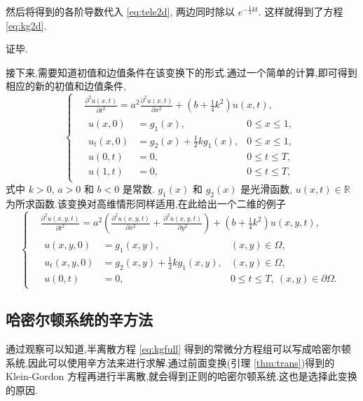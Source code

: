 然后将得到的各阶导数代入 \eqref{eq:tele2d}, 两边同时除以 $e^{-\frac{1}{2}kt}$. 这样就得到了方程 \eqref{eq:kg2d}.

证毕.

接下来,需要知道初值和边值条件在该变换下的形式.通过一个简单的计算,即可得到相应的新的初值和边值条件,
\begin{equation}\label{eq:kgfull}
\left\lbrace
\begin{aligned}
&\frac{\partial ^2 u(x,t)}{\partial t^2}=a^2 \frac{\partial ^2 u(x,t)}{\partial x^2} + (b+\frac{1}{4}k^2) u(x,t),\\
&\begin{aligned}
u(x,0)&=g_1(x),&0 \le x \le 1,\\
u_t(x,0)&=g_2(x)+\frac{1}{2}k g_1(x),&0 \le x \le 1,\\
u(0,t)&=0,&0 \le t \le T,\\
u(1,t)&=0,&0 \le t \le T,
\end{aligned}
\end{aligned}
\right.
\end{equation}
式中 $k > 0$, $a>0$ 和 $b < 0$ 是常数. $g_1(x)$ 和 $g_2(x)$ 是光滑函数, $u(x,t) \in \mathbb{R}$ 为所求函数.该变换对高维情形同样适用,在此给出一个二维的例子
\begin{equation*}
\left\lbrace
\begin{aligned}
&\frac{\partial ^2 u(x,y,t)}{\partial t^2}=a^2 (\frac{\partial ^2 u(x,y,t)}{\partial x^2}+ \frac{\partial ^2 u(x,y,t)}{\partial y^2})
+ (b+\frac{1}{4}k^2) u(x,y,t),\\
&\begin{aligned}
u(x,y,0)&=g_1(x,y),&(x,y)\in \Omega,\\
u_t(x,y,0)&=g_2(x,y)+\frac{1}{2}k g_1(x,y),&(x,y)\in \Omega,\\
u(0,t)&=0,&0 \le t \le T,~(x,y)\in \partial\Omega .
\end{aligned}
\end{aligned}
\right.
\end{equation*}

\subsection{哈密尔顿系统的辛方法}
通过观察可以知道,半离散方程 \eqref{eq:kgfull} 得到的常微分方程组可以写成哈密尔顿系统,因此可以使用辛方法来进行求解.通过前面变换(引理 \ref{thm:trans})得到的 Klein-Gordon 方程再进行半离散,就会得到正则的哈密尔顿系统.这也是选择此变换的原因.

